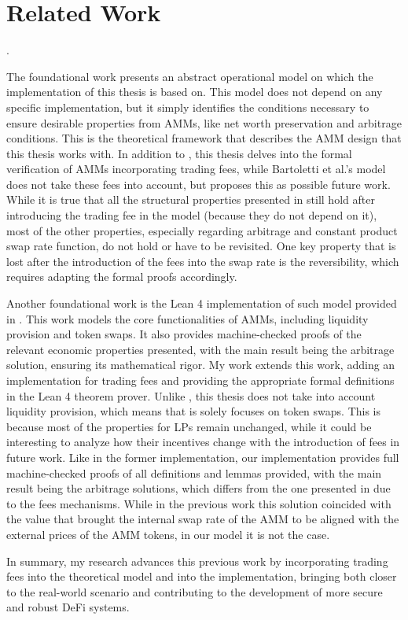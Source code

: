 \section{Related Work}

. 

The foundational work \cite{BCL22lmcs} presents an abstract operational model on which the implementation of this thesis is based on. This model does not depend on any specific implementation, but it simply identifies the conditions necessary to ensure desirable properties from AMMs, like net worth preservation and arbitrage conditions. This is the theoretical framework that describes the AMM design that this thesis works with. In addition to \cite{BCL22lmcs}, this thesis delves into the formal verification of AMMs incorporating trading fees, while Bartoletti et al.'s model does not take these fees into account, but proposes this as possible future work. While it is true that all the structural properties presented in \cite{BCL22lmcs} still hold after introducing the trading fee in the model (because they do not depend on it), most of the other properties, especially regarding arbitrage and constant product swap rate function, do not hold or have to be revisited. One key property that is lost after the introduction of the fees into the swap rate is the reversibility, which requires adapting the formal proofs accordingly.

Another foundational work is the Lean 4 implementation of such model provided in \cite{PB24arxiv}. This work models the core functionalities of AMMs, including liquidity provision and token swaps. It also provides machine-checked proofs of the relevant economic properties presented, with the main result being the arbitrage solution, ensuring its mathematical rigor. My work extends this work, adding an implementation for trading fees and providing the appropriate formal definitions in the Lean 4 theorem prover. Unlike \cite{PB24arxiv}, this thesis does not take into account liquidity provision, which means that is solely focuses on token swaps. This is because most of the properties for LPs remain unchanged, while it could be interesting to analyze how their incentives change with the introduction of fees in future work. Like in the former implementation, our implementation provides full machine-checked proofs of all definitions and lemmas provided, with the main result being the arbitrage solutions, which differs from the one presented in \cite{BCL22lmcs} due to the fees mechanisms. While in the previous work this solution coincided with the value that brought the internal swap rate of the AMM to be aligned with the external prices of the AMM tokens, in our model it is not the case.

In summary, my research advances this previous work by incorporating trading fees into the theoretical model and into the implementation, bringing both closer to the real-world scenario and contributing to the development of more secure and robust DeFi systems.  